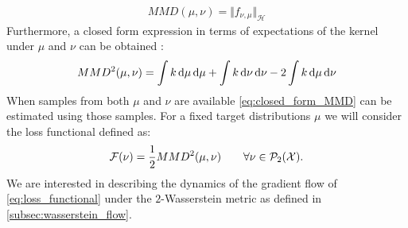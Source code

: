 \begin{align}\label{eq:mmd_norm_witness}
	MMD(\mu,\nu) = \Vert f_{\nu,\mu} \Vert_{\mathcal{H}} 
\end{align}
Furthermore, a closed form expression in terms of expectations of the kernel under $\mu$ and $\nu$ can be obtained \cite{gretton2012kernel}:
\begin{align}\label{eq:closed_form_MMD}
	MMD^2(\mu,\nu) = \int k\mathop{}\!\mathrm{d}\mu \mathop{}\!\mathrm{d}\mu + \int k\mathop{}\!\mathrm{d}\nu \mathop{}\!\mathrm{d} \nu - 2\int k\mathop{}\!\mathrm{d}\mu \mathop{}\!\mathrm{d} \nu
\end{align}
When samples from both $\mu$ and $\nu$ are available \cref{eq:closed_form_MMD} can be estimated using those samples. For a fixed target distributions $\mu$ we will consider the loss functional defined as:
\begin{align}\label{eq:loss_functional}
	{{\mathcal F}}(\nu) = \frac{1}{2} MMD^2(\mu,\nu) \qquad \forall \nu \in \mathcal{P}_2({{\mathcal X}}).
\end{align}
We are interested in describing the dynamics of the gradient flow of \cref{eq:loss_functional} under the $2$-Wasserstein metric as defined in \cref{subsec:wasserstein_flow}.
